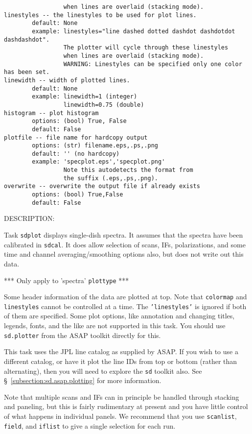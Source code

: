 \begin{verbatim}
                 when lines are overlaid (stacking mode).
linestyles -- the linestyles to be used for plot lines.
        default: None
        example: linestyles="line dashed dotted dashdot dashdotdot dashdashdot".
                 The plotter will cycle through these linestyles
                 when lines are overlaid (stacking mode).
                 WARNING: Linestyles can be specified only one color has been set.
linewidth -- width of plotted lines.
        default: None
        example: linewidth=1 (integer)
                 linewidth=0.75 (double)
histogram -- plot histogram
        options: (bool) True, False
        default: False
plotfile -- file name for hardcopy output
        options: (str) filename.eps,.ps,.png
        default: '' (no hardcopy)
        example: 'specplot.eps','specplot.png'
                 Note this autodetects the format from
                 the suffix (.eps,.ps,.png).
overwrite -- overwrite the output file if already exists
        options: (bool) True,False
        default: False
\end{verbatim}

    DESCRIPTION:
    
    Task {\tt sdplot} displays single-dish spectra.  
    It assumes that the spectra have been calibrated in {\tt sdcal}.
    It does allow selection of scans, IFs, polarizations, and
    some time and channel averaging/smoothing options also,
    but does not write out this data.
    
    *** Only apply to 'spectra' {\tt plottype} ***

    Some header information of the data are plotted at top.
    Note that {\tt colormap} and {\tt linestyles} cannot be controlled at a time.
    The {\tt 'linestyles'} is ignored if both of them are specified.
    Some plot options, like annotation and changing titles,
    legends, fonts, and the like are not supported in this task.
    You should use {\tt sd.plotter} from the ASAP toolkit directly for this.

    This task uses the JPL line catalog as supplied by ASAP.
    If you wish to use a different catalog, or have it plot
    the line IDs from top or bottom (rather than alternating),
    then you will need to explore the {\tt sd} toolkit also.
    See \S~\ref{subsection:sd.asap.plotting} for more information.
    
    Note that multiple scans and IFs can in principle be handled
    through stacking and paneling, but this is fairly rudimentary
    at present and you have little control of what happens in
    individual panels.  We recommend that you use {\tt scanlist}, 
    {\tt field}, and {\tt iflist} to give a single selection for each run.


